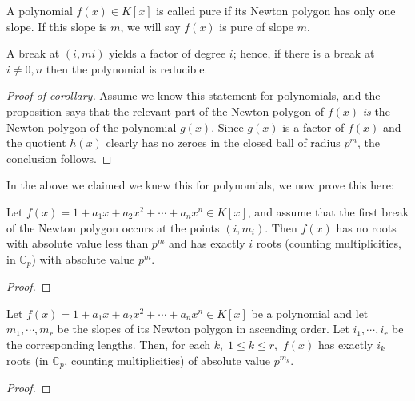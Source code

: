 
\begin{definition}
    A polynomial $f(x) \in K[x]$ is called pure if its Newton polygon has only one slope. If this
    slope is $m$, we will say $f(x)$ is pure of slope $m$.
\end{definition}

\begin{theorem}
    A break at $(i,mi)$ yields a factor of degree $i$; hence, if there is a break at $i \neq 0, n$
    then the polynomial is reducible.
\end{theorem}

\begin{proof}[Proof of corollary]
    Assume we know this statement for polynomials, and the proposition says that the relevant
    part of the Newton polygon of $f(x)$ \emph{is} the Newton polygon of the polynomial $g(x)$.
    Since $g(x)$ is a factor of $f(x)$ and the quotient $h(x)$ clearly has no zeroes in the closed
    ball of radius $p^m$, the conclusion follows.
\end{proof}

In the above we claimed we knew this for polynomials, we now prove this here:

\begin{theorem}
    Let $f(x) = 1 + a_1 x + a_2 x^2 + \cdots + a_n x^n \in K[x]$, and assume that the first break of
    the Newton polygon occurs at the points $(i, m_i)$. Then $f(x)$ has no roots with absolute value
    less than $p^m$ and has exactly $i$ roots (counting multiplicities, in $\mathbb{C}_p$) with
    absolute value $p^m$.
\end{theorem}

\begin{proof}

\end{proof}

\begin{theorem}
    Let $f(x) = 1 + a_1 x + a_2 x^2 + \cdots + a_n x^n \in K[x]$ be a polynomial and let $m_1, \cdots,
    m_r$ be the slopes of its Newton polygon in ascending order. Let $i_1, \cdots, i_r$ be the
    corresponding lengths. Then, for each $k, \; 1 \leq k \leq r,$ $f(x)$ has exactly $i_k$ roots
    (in $\mathbb{C}_p$, counting multiplicities) of absolute value $p^{m_k}$.
\end{theorem}

\begin{proof}

\end{proof}




